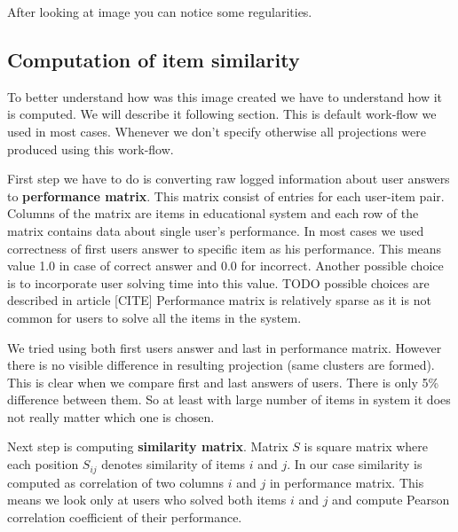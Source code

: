 \documentclass[
  digital, %
  table,   %
  nolof,     %
  nolot,     %
  nocover
]{fithesis3}
\begin{document}


After looking at image you can notice some regularities.

\subsection{Computation of item
similarity}\label{computation-of-item-similarity}


To better understand how was this image created we have to understand
how it is computed. We will describe it following section. This is
default work-flow we used in most cases. Whenever we don't specify
otherwise all projections were produced using this work-flow.


First step we have to do is converting raw logged information about
user answers to \textbf{performance matrix}. This matrix consist of entries for
each user-item pair. Columns of the matrix are items in educational
system and each row of the matrix contains data about single user's
performance. In most cases we used correctness of first users answer
to specific item as his performance. This means value 1.0 in case of
correct answer and 0.0 for incorrect. Another possible choice is to
incorporate user solving time into this value. TODO possible choices
are described in article [CITE] Performance matrix is relatively
sparse as it is not common for users to solve all the items in the
system.

We tried using both first users answer and last in performance matrix.
However there is no visible difference in resulting projection (same
clusters are formed). This is clear when we compare first and last
answers of users. There is only 5\% difference between them. So at least
with large number of items in system it does not really matter which one
is chosen.


Next step is computing \textbf{similarity matrix}. Matrix $S$ is square
matrix where each position $S_{ij}$ denotes similarity of items
$i$ and $j$. In our case similarity is computed as correlation of
two columns $i$ and $j$ in performance matrix. This means we look
only at users who solved both items $i$ and $j$ and compute
Pearson correlation coefficient of their performance.
\end{document}
